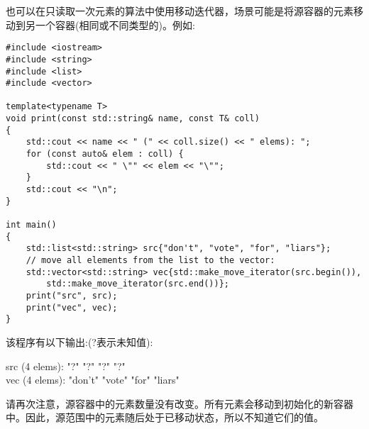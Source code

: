 也可以在只读取一次元素的算法中使用移动迭代器，场景可能是将源容器的元素移动到另一个容器(相同或不同类型的)。例如:\par

{\color{red}{lib/moveitor.cpp}}\par

\begin{lstlisting}[caption={}]
#include <iostream>
#include <string>
#include <list>
#include <vector>

template<typename T>
void print(const std::string& name, const T& coll)
{
	std::cout << name << " (" << coll.size() << " elems): ";
	for (const auto& elem : coll) {
		std::cout << " \"" << elem << "\"";
	}
	std::cout << "\n";
}

int main()
{
	std::list<std::string> src{"don't", "vote", "for", "liars"};
	// move all elements from the list to the vector:
	std::vector<std::string> vec{std::make_move_iterator(src.begin()),
		std::make_move_iterator(src.end())};
	print("src", src);
	print("vec", vec);
}
\end{lstlisting}

该程序有以下输出:(?表示未知值):\par

\begin{tcolorbox}[colback=white,colframe=black]
src (4 elems): "?" "?" "?" "?" \\
vec (4 elems): "don't" "vote" "for" "liars"
\end{tcolorbox}

请再次注意，源容器中的元素数量没有改变。所有元素会移动到初始化的新容器中。因此，源范围中的元素随后处于已移动状态，所以不知道它们的值。\par






































